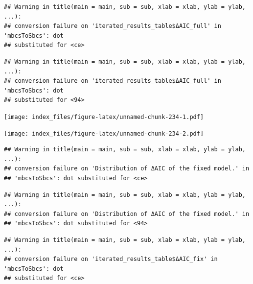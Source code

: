 \documentclass[
]{article}
\newenvironment{Shaded}{\begin{snugshade}}{\end{snugshade}}
\newcommand{\AttributeTok}[1]{\textcolor[rgb]{0.77,0.63,0.00}{#1}}
\newcommand{\FunctionTok}[1]{\textcolor[rgb]{0.00,0.00,0.00}{#1}}
\newcommand{\NormalTok}[1]{#1}
\newcommand{\SpecialCharTok}[1]{\textcolor[rgb]{0.00,0.00,0.00}{#1}}
\newcommand{\StringTok}[1]{\textcolor[rgb]{0.31,0.60,0.02}{#1}}
\begin{document}
\begin{verbatim}
## Warning in title(main = main, sub = sub, xlab = xlab, ylab = ylab, ...):
## conversion failure on 'iterated_results_table$ΔAIC_full' in 'mbcsToSbcs': dot
## substituted for <ce>
\end{verbatim}

\begin{verbatim}
## Warning in title(main = main, sub = sub, xlab = xlab, ylab = ylab, ...):
## conversion failure on 'iterated_results_table$ΔAIC_full' in 'mbcsToSbcs': dot
## substituted for <94>
\end{verbatim}

\texttt{[image: index\_files/figure-latex/unnamed-chunk-234-1.pdf]}

\begin{Shaded}
\end{Shaded}

\texttt{[image: index\_files/figure-latex/unnamed-chunk-234-2.pdf]}

\begin{Shaded}
\end{Shaded}

\begin{verbatim}
## Warning in title(main = main, sub = sub, xlab = xlab, ylab = ylab, ...):
## conversion failure on 'Distribution of ΔAIC of the fixed model.' in
## 'mbcsToSbcs': dot substituted for <ce>
\end{verbatim}

\begin{verbatim}
## Warning in title(main = main, sub = sub, xlab = xlab, ylab = ylab, ...):
## conversion failure on 'Distribution of ΔAIC of the fixed model.' in
## 'mbcsToSbcs': dot substituted for <94>
\end{verbatim}

\begin{verbatim}
## Warning in title(main = main, sub = sub, xlab = xlab, ylab = ylab, ...):
## conversion failure on 'iterated_results_table$ΔAIC_fix' in 'mbcsToSbcs': dot
## substituted for <ce>
\end{verbatim}
\end{document}
